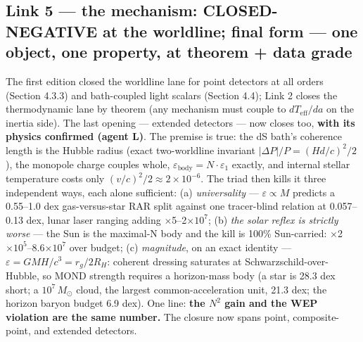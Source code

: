 \documentclass[11pt,a4paper]{article}
\begin{document}
\subsection{Link 5 --- the mechanism: CLOSED-NEGATIVE at the worldline; final form --- one object, one property, at theorem + data grade}

The first edition closed the worldline lane for point detectors at all orders (Section 4.3.3) and bath-coupled light scalars (Section 4.4); Link 2 closes the thermodynamic lane by theorem (any mechanism must couple to $dT_{\mathrm{eff}}/da$ on the inertia side). The last opening --- extended detectors --- now closes too, \textbf{with its physics confirmed (agent L)}. The premise is true: the dS bath's coherence length is the Hubble radius (exact two-worldline invariant $|\Delta P|/P = (Hd/c)^2/2$), the monopole charge couples whole, $\varepsilon_{\mathrm{body}} = N\cdot\varepsilon_1$ exactly, and internal stellar temperature costs only $(v/c)^2/2 \approx 2\times10^{-6}$. The triad then kills it three independent ways, each alone sufficient: (a) \emph{universality} --- $\varepsilon \propto M$ predicts a 0.55--1.0 dex gas-versus-star RAR split against one tracer-blind relation at 0.057--0.13 dex, lunar laser ranging adding $\times$5--2$\times10^{7}$; (b) \emph{the solar reflex is strictly worse} --- the Sun is the maximal-N body and the kill is 100\% Sun-carried: $\times$2$\times10^{5}$--8.6$\times10^{7}$ over budget; (c) \emph{magnitude}, on an exact identity --- \textbf{$\varepsilon = GMH/c^3 = r_g/2R_H$}: coherent dressing saturates at Schwarzschild-over-Hubble, so MOND strength requires a horizon-mass body (a star is 28.3 dex short; a $10^7\,M_\odot$ cloud, the largest common-acceleration unit, 21.3 dex; the horizon baryon budget 6.9 dex). One line: \textbf{the $N^{2}$ gain and the WEP violation are the same number.} The closure now spans point, composite-point, and extended detectors.
\end{document}
